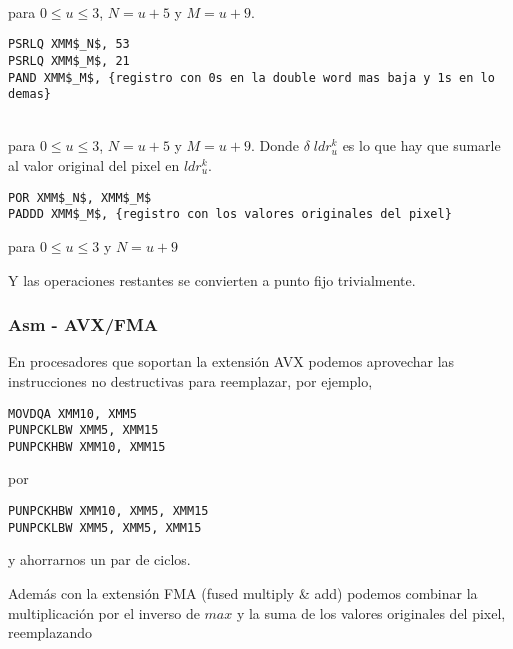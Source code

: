  

  \\
para $0 \le u \le 3$, $N = u+5$ y $M = u+9$.

\begin{lstlisting}
PSRLQ XMM$_N$, 53
PSRLQ XMM$_M$, 21
PAND XMM$_M$, {registro con 0s en la double word mas baja y 1s en lo demas}
\end{lstlisting}

 

  \\
para $0 \le u \le 3$, $N = u+5$ y $M = u+9$. Donde $\delta \; ldr^k_u$ es lo que hay que sumarle al valor original del pixel en $ldr^k_u$.

\begin{lstlisting}
POR XMM$_N$, XMM$_M$
PADDD XMM$_M$, {registro con los valores originales del pixel}
\end{lstlisting}

 
para $0 \le u \le 3$ y $N = u+9$

Y las operaciones restantes se convierten a punto fijo trivialmente.

\subsubsection{Asm - AVX/FMA}

En procesadores que soportan la extensión AVX podemos aprovechar las instrucciones no destructivas para reemplazar, por ejemplo,

\begin{lstlisting}
MOVDQA XMM10, XMM5
PUNPCKLBW XMM5, XMM15
PUNPCKHBW XMM10, XMM15
\end{lstlisting}

por

\begin{lstlisting}
PUNPCKHBW XMM10, XMM5, XMM15
PUNPCKLBW XMM5, XMM5, XMM15
\end{lstlisting}

y ahorrarnos un par de ciclos.

Además con la extensión FMA (fused multiply \& add) podemos combinar la multiplicación por el inverso de $max$ y la suma de los valores originales del pixel, reemplazando

